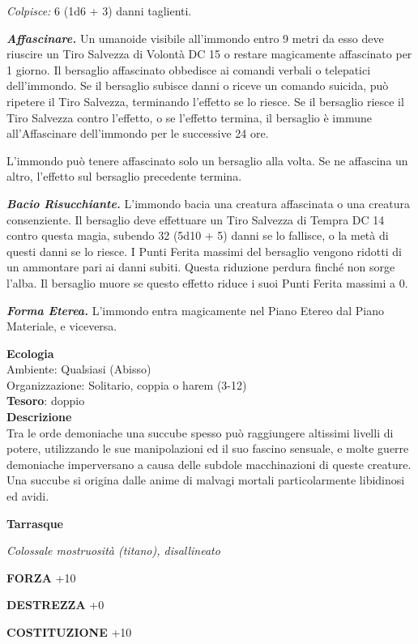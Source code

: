 \begin{multicols}{2}
\textit{Colpisce:} 6 (1d6 + 3) danni taglienti.

\textit{\textbf{Affascinare.}} Un umanoide visibile all'immondo entro 9 metri da esso deve riuscire un Tiro Salvezza di Volontà DC 15 o restare magicamente affascinato per 1 giorno. Il bersaglio affascinato obbedisce ai comandi verbali o telepatici dell'immondo. Se il bersaglio subisce danni o riceve un comando suicida, può ripetere il Tiro Salvezza, terminando l'effetto se lo riesce. Se il bersaglio riesce il Tiro Salvezza contro l'effetto, o se l'effetto termina, il bersaglio è immune all'Affascinare dell'immondo per le successive 24 ore.

L'immondo può tenere affascinato solo un bersaglio alla volta. Se ne affascina un altro, l'effetto sul bersaglio precedente termina.

\textit{\textbf{Bacio Risucchiante.}} L'immondo bacia una creatura affascinata o una creatura consenziente. Il bersaglio deve effettuare un Tiro Salvezza di Tempra DC 14 contro questa magia, subendo 32 (5d10 + 5) danni se lo fallisce, o la metà di questi danni se lo riesce. I Punti Ferita massimi del bersaglio vengono ridotti di un ammontare pari ai danni subiti. Questa riduzione perdura finché non sorge l'alba. Il bersaglio muore se questo effetto riduce i suoi Punti Ferita massimi a 0.

\textit{\textbf{Forma Eterea.}} L'immondo entra magicamente nel Piano Etereo dal Piano Materiale, e viceversa.

\textbf{Ecologia}\\
Ambiente: Qualsiasi (Abisso)\\
Organizzazione: Solitario, coppia o harem (3-12)\\
\textbf{Tesoro}: doppio\\
\textbf{Descrizione}\\
Tra le orde demoniache una succube spesso può raggiungere altissimi livelli di potere, utilizzando le sue manipolazioni ed il suo fascino sensuale, e molte guerre demoniache imperversano a causa delle subdole macchinazioni di queste creature. Una succube si origina dalle anime di malvagi mortali particolarmente libidinosi ed avidi.


\medskip{}\textbf{Tarrasque}

\textit{Colossale mostruosità (titano), disallineato}

\textbf{FORZA} +10

\textbf{DESTREZZA} +0

\textbf{COSTITUZIONE} +10


\end{multicols}
